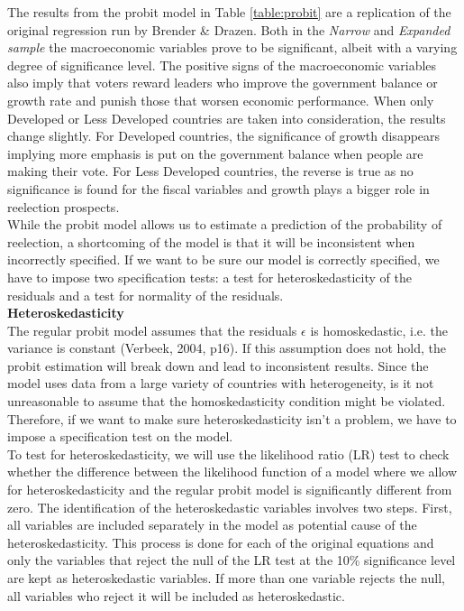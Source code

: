 \documentclass[12pt]{article}
\begin{document}
The results from the probit model in Table \ref{table:probit} are a replication of the original regression run by Brender \& Drazen. Both in the \textit{Narrow} and \textit{Expanded sample} the macroeconomic variables prove to be significant, albeit with a varying degree of significance level. The positive signs of the macroeconomic variables also imply that voters reward leaders who improve the government balance or growth rate and punish those that worsen economic performance. When only Developed or Less Developed countries are taken into consideration, the results change slightly. For Developed countries, the significance of growth disappears implying more emphasis is put on the government balance when people are making their vote. For Less Developed countries, the reverse is true as no significance is found for the fiscal variables and growth plays a bigger role in reelection prospects.\\
While the probit model allows us to estimate a prediction of the probability of reelection, a shortcoming of the model is that it will be inconsistent when incorrectly specified. If we want to be sure our model is correctly specified, we have to impose two specification tests: a test for heteroskedasticity of the residuals and a test for normality of the residuals. \\

\textbf{Heteroskedasticity}\\
The regular probit model assumes that the residuals $\epsilon$ is homoskedastic, i.e. the variance is constant (Verbeek, 2004, p16). If this assumption does not hold, the probit estimation will break down and lead to inconsistent results. Since the model uses data from a large variety of countries with heterogeneity, is it not unreasonable to assume that the homoskedasticity condition might be violated. Therefore, if we want to make sure heteroskedasticity isn't a problem, we have to impose a specification test on the model.\\
To test for heteroskedasticity, we will use the likelihood ratio (LR) test to check whether the difference between the likelihood function of a model where we allow for heteroskedasticity and the regular probit model is significantly different from zero. The identification of the heteroskedastic variables involves two steps. First, all variables are included separately in the model as potential cause of the heteroskedasticity. This process is done for each of the original equations and only the variables that reject the null of the LR test at the 10\% significance level are kept as heteroskedastic variables. If more than one variable rejects the null, all variables who reject it will be included as heteroskedastic.\\\pagebreak
\end{document}
